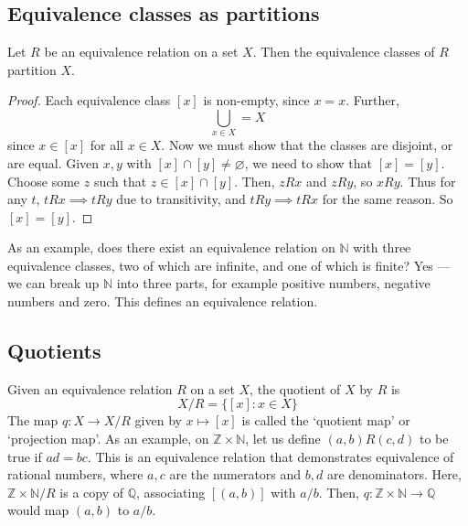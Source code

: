 \subsection{Equivalence classes as partitions}
\begin{proposition}
	Let \(R\) be an equivalence relation on a set \(X\).
	Then the equivalence classes of \(R\) partition \(X\).
\end{proposition}
\begin{proof}
	Each equivalence class \([x]\) is non-empty, since \(x = x\).
	Further,
	\[
		\bigcup_{x \in X} = X
	\]
	since \(x \in [x]\) for all \(x \in X\).
	Now we must show that the classes are disjoint, or are equal.
	Given \(x, y\) with \([x] \cap [y] \neq \varnothing\), we need to show that \([x] = [y]\).
	Choose some \(z\) such that \(z \in [x] \cap [y]\).
	Then, \(zRx\) and \(zRy\), so \(xRy\).
	Thus for any \(t\), \(tRx \implies tRy\) due to transitivity, and \(tRy \implies tRx\) for the same reason.
	So \([x] = [y]\).
\end{proof}
As an example, does there exist an equivalence relation on \(\mathbb N\) with three equivalence classes, two of which are infinite, and one of which is finite?
Yes --- we can break up \(\mathbb N\) into three parts, for example positive numbers, negative numbers and zero.
This defines an equivalence relation.

\subsection{Quotients}
Given an equivalence relation \(R\) on a set \(X\), the quotient of \(X\) by \(R\) is
\[
	X/R = \{ [x]: x \in X \}
\]
The map \(q\colon X\to X/R\) given by \(x \mapsto [x]\) is called the `quotient map' or `projection map'.
As an example, on \(\mathbb Z \times \mathbb N\), let us define \((a, b)R(c, d)\) to be true if \(ad=bc\).
This is an equivalence relation that demonstrates equivalence of rational numbers, where \(a, c\) are the numerators and \(b, d\) are denominators.
Here, \(\mathbb Z \times \mathbb N / R\) is a copy of \(\mathbb Q\), associating \([(a, b)]\) with \(a/b\).
Then, \(q\colon \mathbb Z \times \mathbb N \to \mathbb Q\) would map \((a, b)\) to \(a/b\).
